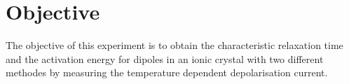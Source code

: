 \section{Objective}
The objective of this experiment is to obtain the characteristic relaxation time and the activation energy for dipoles in an ionic crystal with two different methodes by measuring the temperature dependent depolarisation current. 
